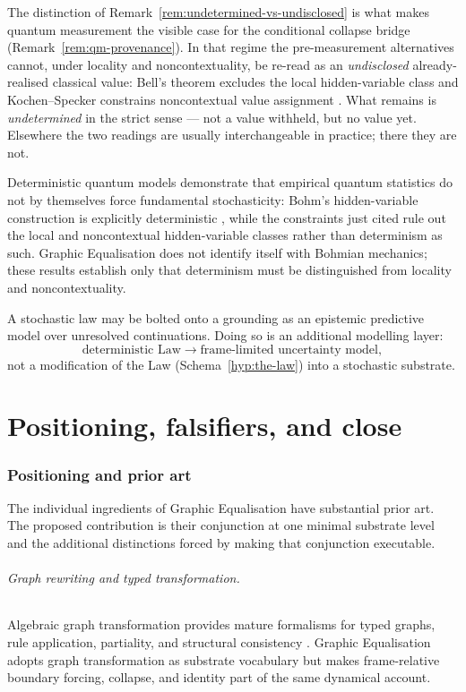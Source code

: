 \documentclass[11pt,a4paper]{article}
\theoremstyle{remark}\newtheorem{remark}[definition]{Remark}
\begin{document}
The distinction of Remark~\ref{rem:undetermined-vs-undisclosed} is what makes quantum measurement the visible case for the conditional collapse bridge (Remark~\ref{rem:qm-provenance}). In that regime the pre-measurement alternatives cannot, under locality and noncontextuality, be re-read as an \emph{undisclosed} already-realised classical value: Bell's theorem excludes the local hidden-variable class and Kochen--Specker constrains noncontextual value assignment \citep{bell1964,kochen1967}. What remains is \emph{undetermined} in the strict sense --- not a value withheld, but no value yet. Elsewhere the two readings are usually interchangeable in practice; there they are not.

Deterministic quantum models demonstrate that empirical quantum statistics do not by themselves force fundamental stochasticity: Bohm's hidden-variable construction is explicitly deterministic \citep{bohm1952}, while the constraints just cited rule out the local and noncontextual hidden-variable classes rather than determinism as such. Graphic Equalisation does not identify itself with Bohmian mechanics; these results establish only that determinism must be distinguished from locality and noncontextuality.

A stochastic law may be bolted onto a grounding as an epistemic predictive model over unresolved continuations. Doing so is an additional modelling layer:
\[
\text{deterministic Law}
\longrightarrow
\text{frame-limited uncertainty model},
\]
not a modification of the Law (Schema~\ref{hyp:the-law}) into a stochastic substrate.

\part{Positioning, falsifiers, and close}
\section{Positioning and prior art}\label{sec:prior-art}

The individual ingredients of Graphic Equalisation have substantial prior art. The proposed contribution is their conjunction at one minimal substrate level and the additional distinctions forced by making that conjunction executable.

\paragraph{Graph rewriting and typed transformation.} Algebraic graph transformation provides mature formalisms for typed graphs, rule application, partiality, and structural consistency \citep{ehrig2006}. Graphic Equalisation adopts graph transformation as substrate vocabulary but makes frame-relative boundary forcing, collapse, and identity part of the same dynamical account.
\end{document}
